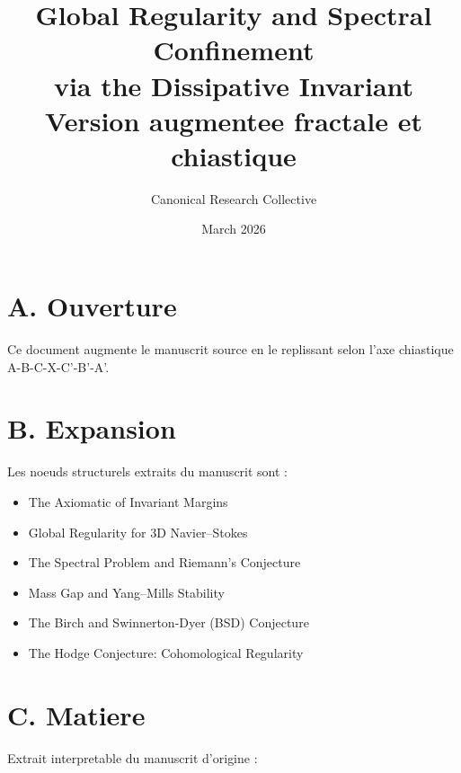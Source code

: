 ﻿\documentclass[11pt,a4paper]{article}
\title{Global Regularity and Spectral Confinement\\ via the Dissipative Invariant \\ \large Version augmentee fractale et chiastique}
\author{Canonical Research Collective}
\date{March 2026}
\begin{document}
\maketitle



\section*{A. Ouverture}

Ce document augmente le manuscrit source en le replissant selon l'axe chiastique A-B-C-X-C'-B'-A'.



\section*{B. Expansion}

Les noeuds structurels extraits du manuscrit sont :

\begin{itemize}[leftmargin=1.2cm]

\item The Axiomatic of Invariant Margins

\item Global Regularity for 3D Navier--Stokes

\item The Spectral Problem and Riemann's Conjecture

\item Mass Gap and Yang--Mills Stability

\item The Birch and Swinnerton-Dyer (BSD) Conjecture

\item The Hodge Conjecture: Cohomological Regularity

\end{itemize}



\section*{C. Matiere}

Extrait interpretable du manuscrit d'origine :
\end{document}

